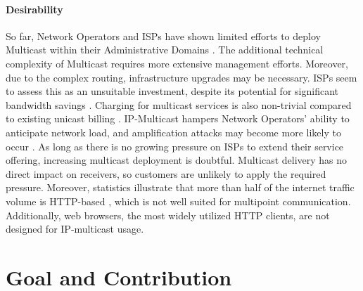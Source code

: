 \paragraph{Desirability} %
\label{par:Desirability}


So far, Network Operators and ISPs have shown limited efforts to deploy
    Multicast within their Administrative Domains
    \cite{diot2000deployment, ratnasamy2006revisiting}.
The additional technical complexity of Multicast requires more extensive
    management efforts.
Moreover, due to the complex routing, infrastructure upgrades may be necessary.
ISPs seem to assess this as an unsuitable investment, despite its potential
    for significant bandwidth savings \cite{diot2000deployment}.
Charging for multicast services is also non-trivial compared to existing
    unicast billing \cite{ratnasamy2006revisiting}.
IP-Multicast hampers Network Operators' ability to anticipate network load, and
    amplification attacks may become more likely to occur
    \cite{diot2000deployment}.
As long as there is no growing pressure on ISPs to extend their service
    offering, increasing multicast deployment is doubtful.
Multicast delivery has no direct impact on receivers, so customers are unlikely
    to apply the required pressure.
Moreover, statistics illustrate that more than half of the internet traffic
    volume is HTTP-based \cite{cloudflare2023radar}, which is not well suited
    for multipoint communication.
Additionally, web browsers, the most widely utilized HTTP clients, are not
    designed for IP-multicast usage.


\section{Goal and Contribution} %
\label{sec:Contribution}

